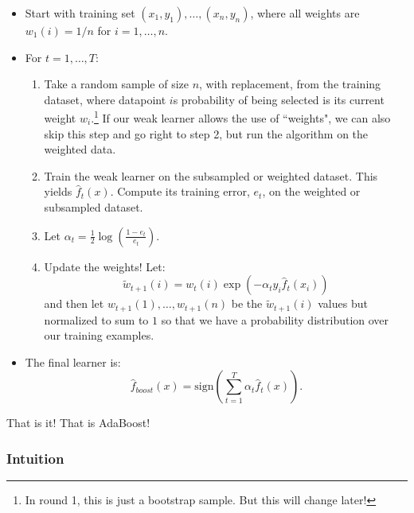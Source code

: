 \begin{itemize}
\item Start with training set $(x_1,y_1),\ldots,(x_n,y_n)$, where all weights are $w_1(i) = 1/n$ for $i=1,\ldots,n$.
\item For $t=1,\ldots,T$:
\begin{enumerate}
\item Take a random sample of size $n$, with replacement, from the training dataset, where datapoint $i$s probability of being selected is its current weight $w_i$.\footnote{In round 1, this is just a bootstrap sample. But this will change later!} If our weak learner allows the use of ``weights", we can also skip this step and go right to step 2, but run the algorithm on the weighted data.
\item Train the weak learner on the subsampled or weighted dataset. This yields $\hat{f}_t(x)$. Compute its training error, $e_t$, on the weighted or subsampled dataset. 
\item Let $\alpha_t = \frac{1}{2} \log\left( \frac{1- e_t}{e_t} \right)$. 
\item Update the weights! Let:
$$
\tilde{w}_{t+1}(i) = w_t(i) \exp \left( -\alpha_t y_i \hat{f}_t(x_i)\right)
$$
and then let $w_{t+1}(1), \ldots, w_{t+1}(n)$ be the $\tilde{w}_{t+1}(i)$ values but normalized to sum to $1$ so that we have a probability distribution over our training examples.  
\end{enumerate}
\item The final learner is:
$$
\hat{f}_{boost}(x) = \text{sign}\left( \sum_{t=1}^T \alpha_t \hat{f}_t(x) \right).
$$
\end{itemize}
That is it! That is AdaBoost! 

\subsubsection{Intuition}


